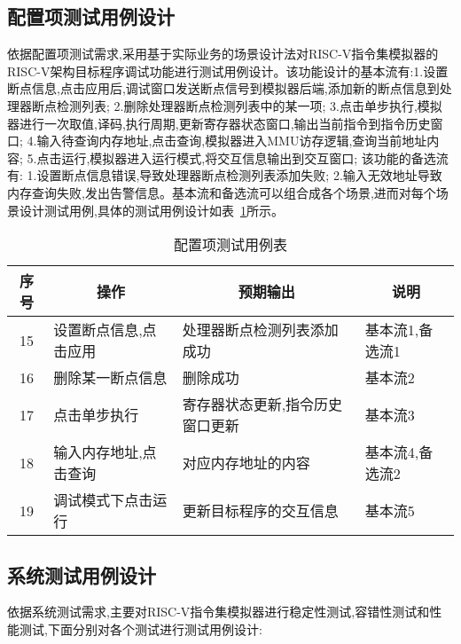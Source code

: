 \subsection{配置项测试用例设计}
依据配置项测试需求,采用基于实际业务的场景设计法对RISC-V指令集模拟器的RISC-V架构目标程序调试功能进行测试用例设计。该功能设计的基本流有:1.设置断点信息,点击应用后,调试窗口发送断点信号到模拟器后端,添加新的断点信息到处理器断点检测列表; 2.删除处理器断点检测列表中的某一项; 3.点击单步执行,模拟器进行一次取值,译码,执行周期,更新寄存器状态窗口,输出当前指令到指令历史窗口; 4.输入待查询内存地址,点击查询,模拟器进入MMU访存逻辑,查询当前地址内容; 5.点击运行,模拟器进入运行模式,将交互信息输出到交互窗口; 该功能的备选流有: 1.设置断点信息错误,导致处理器断点检测列表添加失败; 2.输入无效地址导致内存查询失败,发出告警信息。基本流和备选流可以组合成各个场景,进而对每个场景设计测试用例,具体的测试用例设计如表~\ref{tab:test5}所示。
\begin{table}[h]
    \centering
    \caption{配置项测试用例表}
    \label{tab:test5}
    \renewcommand\arraystretch{1.2}
    \begin{tabular}{clll}
      \toprule
      \multicolumn{1}{c}{序号} & \multicolumn{1}{c}{操作} & \multicolumn{1}{c}{预期输出} &\multicolumn{1}{c}{说明}\\
      \midrule
  15	& \multicolumn{1}{m{4cm}}{设置断点信息,点击应用} & \multicolumn{1}{m{3.5cm}}{处理器断点检测列表添加成功} & \multicolumn{1}{m{3cm}}{基本流1,备选流1}\\
  \hline
  16	& \multicolumn{1}{m{4cm}}{删除某一断点信息} & \multicolumn{1}{m{3.5cm}}{删除成功} & \multicolumn{1}{m{3cm}}{基本流2}\\
  \hline
  17	& \multicolumn{1}{m{4cm}}{点击单步执行} & \multicolumn{1}{m{3.5cm}}{寄存器状态更新,指令历史窗口更新} & \multicolumn{1}{m{3cm}}{基本流3}\\
  \hline
  18	& \multicolumn{1}{m{4cm}}{输入内存地址,点击查询} & \multicolumn{1}{m{3.5cm}}{对应内存地址的内容} & \multicolumn{1}{m{3cm}}{基本流4,备选流2}\\
  \hline
  19	& \multicolumn{1}{m{4cm}}{调试模式下点击运行} & \multicolumn{1}{m{3.5cm}}{更新目标程序的交互信息} & \multicolumn{1}{m{3cm}}{基本流5}\\
      \bottomrule
    \end{tabular}
\end{table}


\subsection{系统测试用例设计}
依据系统测试需求,主要对RISC-V指令集模拟器进行稳定性测试,容错性测试和性能测试,下面分别对各个测试进行测试用例设计:


